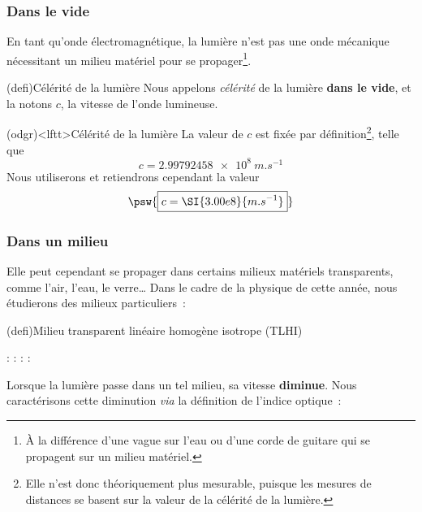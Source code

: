 \documentclass[../../main/main.tex]{subfiles}
\begin{document}
\subsubsection{Dans le vide}

En tant qu'onde électromagnétique, la lumière n'est pas une onde mécanique
nécessitant un milieu matériel pour se propager\footnote{À la différence d'une
	vague sur l'eau ou d'une corde de guitare qui se propagent sur un milieu
	matériel.}.
\begin{tcb*}(defi){Célérité de la lumière}
	Nous appelons \textit{célérité} de la lumière \textbf{dans le vide}, et
	la notons $c$, la vitesse de l'onde lumineuse.
\end{tcb*}
\begin{tcb*}[sidebyside](odgr)<lftt>{Célérité de la lumière}
	La valeur de $c$ est fixée par définition\footnote{Elle n'est donc
		théoriquement plus mesurable, puisque les mesures de distances se basent sur
		la valeur de la célérité de la lumière.}, telle que
	\[c = \SI{2.99792458e8}{m.s^{-1}}\]
	\tcblower
	Nous utiliserons et retiendrons cependant la valeur
	\[
		\psw{%
			\boxed{c = \SI{3.00e8}{m.s^{-1}}}
		}%
	\]
\end{tcb*}

\subsubsection{Dans un milieu}

Elle peut cependant se propager dans certains milieux matériels transparents,
comme l'air, l'eau, le verre… Dans le cadre de la physique de cette année, nous
étudierons des milieux particuliers~:

\begin{tcb*}[list entry={\lte Milieu TLHI}](defi){Milieu transparent linéaire homogène isotrope (TLHI)}
	\begin{itemize}[leftmargin=66pt]
		 : %
		 : %
		 : %
		 : %
	\end{itemize}
\end{tcb*}

Lorsque la lumière passe dans un tel milieu, sa vitesse \textbf{diminue}. Nous
caractérisons cette diminution \textit{via} la définition de l'indice optique~:
\end{document}
